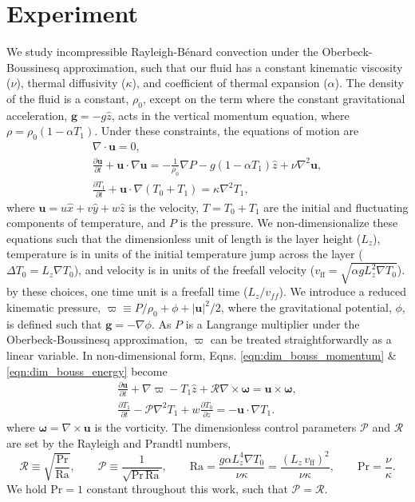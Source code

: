 \documentclass[aps, pre, onecolumn, nofootinbib, notitlepage, groupedaddress, amsfonts, amssymb, amsmath, longbibliography]{revtex4-1}
\newcommand{\DivU}{\ensuremath{\nabla\cdot\bm{u}}}
\newcommand{\grad}{\ensuremath{\nabla}}
\newcommand{\RB}{Rayleigh-B\'{e}nard }
\begin{document}
\section{Experiment}
\label{sec:experiment}
We study incompressible \RB convection under the Oberbeck-Boussinesq approximation,
such that our fluid
has a constant kinematic viscosity ($\nu$), thermal diffusivity ($\kappa$), and coefficient
of thermal expansion ($\alpha$). The density of the fluid is a constant, $\rho_0$, except on the
term where the constant gravitational acceleration, $\bm{g} = - g\hat{z}$, acts in the vertical momentum equation, 
where $\rho = \rho_0(1  - \alpha T_1)$.  
Under these constraints, the equations of motion are \cite{spiegel&veronis1960}
\begin{gather}
\DivU = 0, 
	\label{eqn:incompressible}
\\
\frac{\partial \bm{u}}{\partial t} + \bm{u}\cdot\grad\bm{u} =
-\frac{1}{\rho_0}\grad P - g( 1 - \alpha T_1)\hat{z} + \nu\grad^2\bm{u}, 
	\label{eqn:dim_bouss_momentum}
\\
\frac{\partial T_1}{\partial t} + \bm{u}\cdot\grad(T_0 + T_1) = \kappa\grad^2 T_1,
	\label{eqn:dim_bouss_energy}
\end{gather}
where $\bm{u} = u\hat{x} + v\hat{y} + w\hat{z}$ is the velocity, 
$T = T_0 + T_1$ are the initial and fluctuating components of temperature, 
and $P$ is the pressure.
We non-dimensionalize these equations such that the dimensionless unit of
length is the layer height ($L_z$),
temperature is in units of the initial temperature jump across the layer ($\Delta T_0 = L_z \grad T_0$), 
and velocity is in units of the freefall velocity ($v_{\text{ff}} = \sqrt{\alpha g L_z^2 \grad T_0}$).
by these choices, one time unit is a freefall time ($L_z/v_{ff}$).
We introduce a reduced kinematic pressure,
$\varpi \equiv P / \rho_0 + \phi + |\bm{u}|^2 / 2$, where the gravitational
potential, $\phi$, is defined such that $\bm{g} = -\grad \phi$. As $P$ is a
Langrange multiplier under the Oberbeck-Boussinesq approximation, $\varpi$
can be treated straightforwardly as a linear variable. 
In non-dimensional form, Eqns. \ref{eqn:dim_bouss_momentum} \& \ref{eqn:dim_bouss_energy}
become
\begin{gather}
\frac{\partial \bm{u}}{\partial t} + \grad \varpi - T_1\hat{z} + \mathcal{R}\grad\times\bm{\omega} = \bm{u}\times\bm{\omega},
	\label{eqn:bouss_momentum}
\\
\frac{\partial T_1}{\partial t} - \mathcal{P}\grad^2 T_1 + w \frac{\partial T_0}{\partial z} = - \bm{u}\cdot\grad T_1.
	\label{eqn:bouss_energy}
\end{gather}
where $\bm{\omega} = \grad \times \bm{u}$ is the vorticity.
The dimensionless control parameters $\mathcal{P}$ and $\mathcal{R}$ 
are set by the Rayleigh and Prandtl numbers,
\begin{equation}
\mathcal{R} \equiv \sqrt{\frac{\text{Pr}}{\text{Ra}}}, \qquad \mathcal{P} \equiv \frac{1}{\sqrt{\text{Pr}\,\text{Ra}}}, \qquad
\text{Ra} = \frac{g \alpha L_z^4 \grad T_0}{\nu\kappa} = \frac{(L_z\,v_{\text{ff}})^2}{\nu\kappa}, \qquad \text{Pr} = \frac{\nu}{\kappa}.
\end{equation}
We hold Pr$ = 1$ constant throughout this work, such that $\mathcal{P} = \mathcal{R}$.
\end{document}
